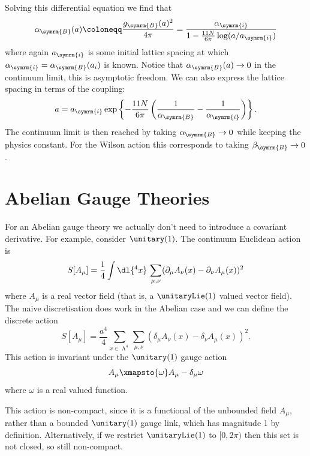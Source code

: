 \documentclass[fleqn]{NotesClass}
\newcommand{\bare}{\symrm{B}}
\newcommand{\lattice}[1][4]{\upLambda^{#1}}
\newcommand{\forwardDerivative}{\delta}
\begin{document}
    Solving this differential equation we find that
    \begin{equation}
        \alpha_\bare(a) \coloneqq \frac{g_\bare(a)^2}{4\pi} = \frac{\alpha_{\symrm{i}}}{1 - \frac{11N}{6\pi}\log(a/a_{\symrm{i}})}
    \end{equation}
    where again \(a_{\symrm{i}}\) is some initial lattice spacing at which \(\alpha_{\symrm{i}} = \alpha_{\bare}(a_i)\) is known.
    Notice that \(\alpha_{\bare}(a) \to 0\) in the continuum limit, this is asymptotic freedom.
    We can also express the lattice spacing in terms of the coupling:
    \begin{equation}
        a = a_{\symrm{i}} \exp\left\{ -\frac{11N}{6\pi}\left( \frac{1}{\alpha_\bare} - \frac{1}{\alpha_{\symrm{i}}} \right) \right\}.
    \end{equation}
    The continuum limit is then reached by taking \(\alpha_\bare \to 0\) while keeping the physics constant.
    For the Wilson action this corresponds to taking \(\beta_{\bare} \to 0\).
    
    \section{Abelian Gauge Theories}
    For an Abelian gauge theory we actually don't need to introduce a covariant derivative.
    For example, consider \(\unitary(1)\).
    The continuum Euclidean action is
    \begin{equation}
        S[A_\mu] = \frac{1}{4}\int \dl{^4x} \, \sum_{\mu,\nu} (\partial_\mu A_\nu(x) - \partial_\nu A_\mu(x))^2
    \end{equation}
    where \(A_\mu\) is a real vector field (that is, a \(\unitaryLie(1)\) valued vector field).
    The naive discretisation does work in the Abelian case and we can define the discrete action
    \begin{equation}
        S[A_\mu] = \frac{a^4}{4} \sum_{x\in\lattice} \sum_{\mu,\nu} (\forwardDerivative_\mu A_\nu(x) - \forwardDerivative_\nu A_\mu(x))^2.
    \end{equation}
    This action is invariant under the \(\unitary(1)\) gauge action
    \begin{equation}
        A_\mu \xmapsto{\omega} A_\mu - \forwardDerivative_\mu \omega
    \end{equation}
    where \(\omega\) is a real valued function.
    
    This action is non-compact, since it is a functional of the unbounded field \(A_\mu\), rather than a bounded \(\unitary(1)\) gauge link, which has magnitude 1 by definition.
    Alternatively, if we restrict \(\unitaryLie(1)\) to \([0, 2\pi)\) then this set is not closed, so still non-compact.
    
\end{document}
